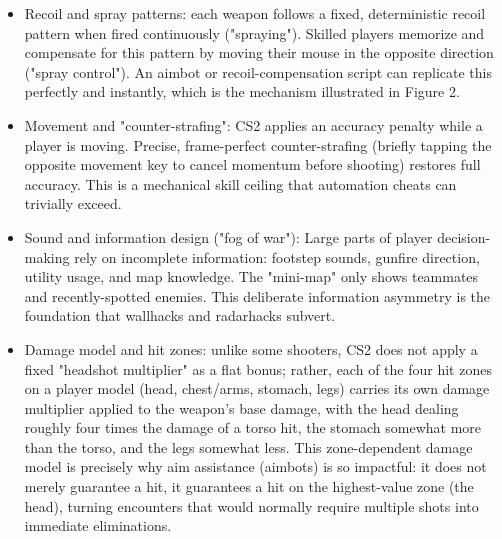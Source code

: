 \begin{itemize}
\item Recoil and spray patterns: each weapon follows a fixed, deterministic recoil pattern when fired continuously ("spraying"). Skilled players memorize and compensate for this pattern by moving their mouse in the opposite direction ("spray control"). An aimbot or recoil-compensation script can replicate this perfectly and instantly, which is the mechanism illustrated in Figure 2.
\item Movement and "counter-strafing": CS2 applies an accuracy penalty while a player is moving. Precise, frame-perfect counter-strafing (briefly tapping the opposite movement key to cancel momentum before shooting) restores full accuracy. This is a mechanical skill ceiling that automation cheats can trivially exceed.
\item Sound and information design ("fog of war"): Large parts of player decision-making rely on incomplete information: footstep sounds, gunfire direction, utility usage, and map knowledge. The "mini-map" only shows teammates and recently-spotted enemies. This deliberate information asymmetry is the foundation that wallhacks and radarhacks subvert.
\item Damage model and hit zones: unlike some shooters, CS2 does not apply a fixed "headshot multiplier" as a flat bonus; rather, each of the four hit zones on a player model (head, chest/arms, stomach, legs) carries its own damage multiplier applied to the weapon's base damage, with the head dealing roughly four times the damage of a torso hit, the stomach somewhat more than the torso, and the legs somewhat less. This zone-dependent damage model is precisely why aim assistance (aimbots) is so impactful: it does not merely guarantee a hit, it guarantees a hit on the highest-value zone (the head), turning encounters that would normally require multiple shots into immediate eliminations.
\end{itemize}
